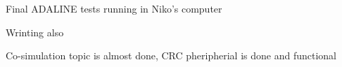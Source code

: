 Final ADALINE tests running in Niko's computer

Wrinting also

Co-simulation topic is almost done, CRC pheripherial is done and functional